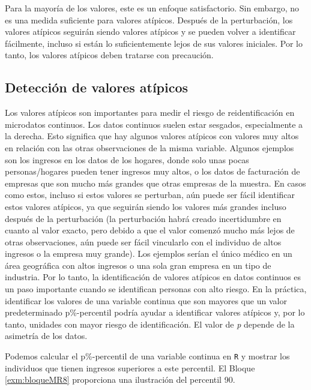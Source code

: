 \documentclass[]{book}
\theoremstyle{definition}
\theoremstyle{definition}
\theoremstyle{definition}
\theoremstyle{definition}
\theoremstyle{remark}
\begin{document}
Para la mayoría de los valores, este es un enfoque satisfactorio. Sin embargo, no es una medida suficiente para valores atípicos. Después de la perturbación, los valores atípicos seguirán siendo valores atípicos y se pueden volver a identificar fácilmente, incluso si están lo suficientemente lejos de sus valores iniciales. Por lo tanto, los valores atípicos deben tratarse con precaución.

\hypertarget{detecciuxf3n-de-valores-atuxedpicos}{%
\subsection{Detección de valores atípicos}\label{detecciuxf3n-de-valores-atuxedpicos}}

Los valores atípicos son importantes para medir el riesgo de reidentificación en microdatos continuos. Los datos continuos suelen estar sesgados, especialmente a la derecha. Esto significa que hay algunos valores atípicos con valores muy altos en relación con las otras observaciones de la misma variable. Algunos ejemplos son los ingresos en los datos de los hogares, donde solo unas pocas personas/hogares pueden tener ingresos muy altos, o los datos de facturación de empresas que son mucho más grandes que otras empresas de la muestra. En casos como estos, incluso si estos valores se perturban, aún puede ser fácil identificar estos valores atípicos, ya que seguirán siendo los valores más grandes incluso después de la perturbación (la perturbación habrá creado incertidumbre en cuanto al valor exacto, pero debido a que el valor comenzó mucho más lejos de otras observaciones, aún puede ser fácil vincularlo con el individuo de altos ingresos o la empresa muy grande). Los ejemplos serían el único médico en un área geográfica con altos ingresos o una sola gran empresa en un tipo de industria. Por lo tanto, la identificación de valores atípicos en datos continuos es un paso importante cuando se identifican personas con alto riesgo. En la práctica, identificar los valores de una variable continua que son mayores que un valor predeterminado p\%-percentil podría ayudar a identificar valores atípicos y, por lo tanto, unidades con mayor riesgo de identificación. El valor de \emph{p} depende de la asimetría de los datos.

Podemos calcular el p\%-percentil de una variable continua en \texttt{R} y mostrar los individuos que tienen ingresos superiores a este percentil. El Bloque \ref{exm:bloqueMR8} proporciona una ilustración del percentil 90.
\end{document}
